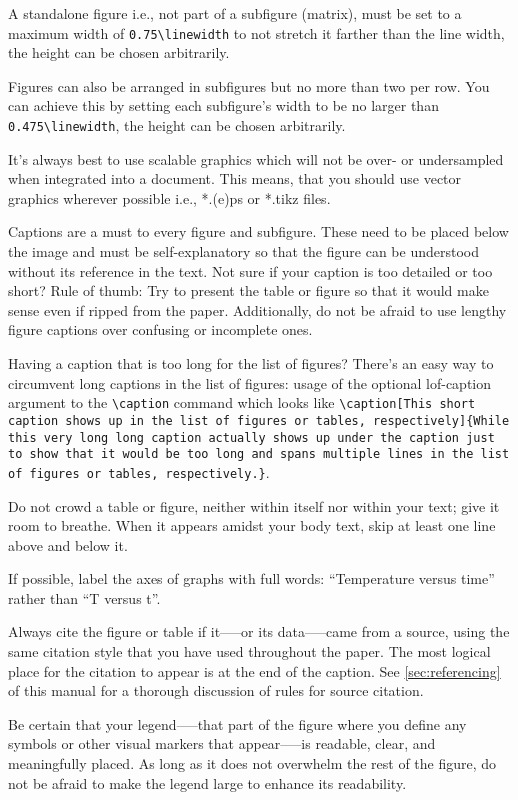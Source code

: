 A standalone figure i.e., not part of a subfigure (matrix), must be set to a maximum width of \lstinline!0.75\linewidth! to not stretch it farther than the line width, the height can be chosen arbitrarily.

Figures can also be arranged in subfigures but no more than two per row.
You can achieve this by setting each subfigure's width to be no larger than \lstinline!0.475\linewidth!, the height can be chosen arbitrarily.

It's always best to use scalable graphics which will not be over- or undersampled when integrated into a document.
This means, that you should use vector graphics wherever possible i.e., *.(e)ps or *.tikz files.

Captions are a must to every figure and subfigure.
These need to be placed below the image and must be self-explanatory so that the figure can be understood without its reference in the text.
Not sure if your caption is too detailed or too short?
Rule of thumb: Try to present the table or figure so that it would make sense even if ripped from the paper.
Additionally, do not be afraid to use lengthy figure captions over confusing or incomplete ones.

Having a caption that is too long for the list of figures? There's an easy way to circumvent long captions in the list of figures: usage of the optional lof-caption argument to the \lstinline!\caption! command which looks like \lstinline[language={[LaTeX]TeX}]!\caption[This short caption shows up in the list of figures or tables, respectively]{While this very long long caption actually shows up under the caption just to show that it would be too long and spans multiple lines in the list of figures or tables, respectively.}!.

Do not crowd a table or figure, neither within itself nor within your text; give it room to breathe. When it appears amidst your body text, skip at least one line above and below it.

If possible, label the axes of graphs with full words: ``Temperature versus time'' rather than ``T versus t''.

Always cite the figure or table if it—--or its data—--came from a source, using the same citation style that you have used throughout the paper. The most logical place for the citation to appear is at the end of the caption. See \cref{sec:referencing} of this manual for a thorough discussion of rules for source citation.

Be certain that your legend—--that part of the figure where you define any symbols or other visual markers that appear—--is readable, clear, and meaningfully placed. As long as it does not overwhelm the rest of the figure, do not be afraid to make the legend large to enhance its readability.


